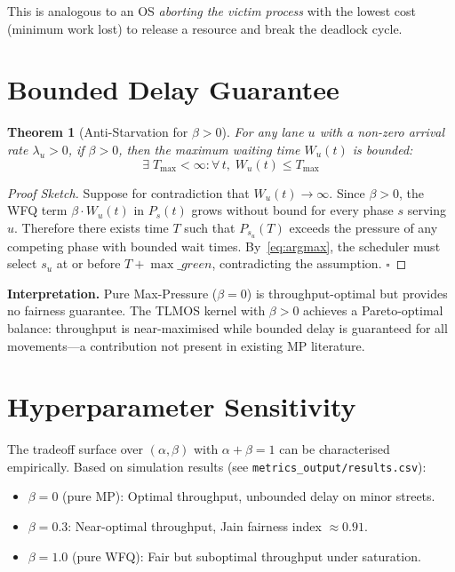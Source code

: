 \documentclass[11pt]{article}
\newtheorem{theorem}{Theorem}
\begin{document}
This is analogous to an OS \emph{aborting the victim process} with the lowest cost
(minimum work lost) to release a resource and break the deadlock cycle.

\section{Bounded Delay Guarantee}

\begin{theorem}[Anti-Starvation for $\beta > 0$]
For any lane $u$ with a non-zero arrival rate $\lambda_u > 0$, if $\beta > 0$,
then the maximum waiting time $W_u(t)$ is bounded:
\[
  \exists\; T_{\max} < \infty : \forall\, t,\; W_u(t) \leq T_{\max}
\]
\end{theorem}

\begin{proof}[Proof Sketch]
Suppose for contradiction that $W_u(t) \to \infty$. Since $\beta > 0$, the
WFQ term $\beta \cdot W_u(t)$ in $P_s(t)$ grows without bound for every phase $s$
serving $u$. Therefore there exists time $T$ such that $P_{s_u}(T)$ exceeds the
pressure of any competing phase with bounded wait times. By~\eqref{eq:argmax}, the
scheduler must select $s_u$ at or before $T + \max\_green$, contradicting the
assumption. $\square$
\end{proof}

\noindent\textbf{Interpretation.} Pure Max-Pressure ($\beta = 0$) is throughput-optimal
\cite{tassiulas1992stability} but provides no fairness guarantee. The TLMOS kernel
with $\beta > 0$ achieves a Pareto-optimal balance: throughput is near-maximised
while bounded delay is guaranteed for all movements—a contribution not present in
existing MP literature.

\section{Hyperparameter Sensitivity}

The tradeoff surface over $(\alpha, \beta)$ with $\alpha + \beta = 1$ can be
characterised empirically. Based on simulation results (see
\texttt{metrics\_output/results.csv}):

\begin{itemize}
  \item $\beta = 0$ (pure MP): Optimal throughput, unbounded delay on minor streets.
  \item $\beta = 0.3$: Near-optimal throughput, Jain fairness index $\approx 0.91$.
  \item $\beta = 1.0$ (pure WFQ): Fair but suboptimal throughput under saturation.
\end{itemize}
\end{document}
